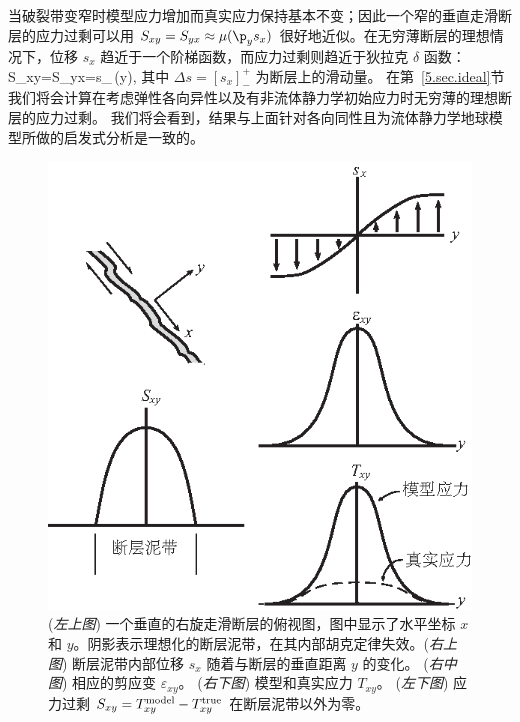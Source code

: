 当破裂带变窄时模型应力增加而真实应力保持基本不变；因此一个窄的垂直走滑断层的应力过剩可以用
$S_{xy}=S_{yx}\approx\mu(\p_y s_x)$ 很好地近似。在无穷薄断层的理想情况下，位移
$s_x$ 趋近于一个阶梯函数，而应力过剩则趋近于狄拉克 $\delta$ 函数：
\eq
\label{5.SanAnd}
S_{xy}=S_{yx}=\mu\Delta s_{\,}\delta(y),
\en
{}%
%
其中 $\Delta s=[s_x]^+_-$ 为断层上的滑动量。
在第~\ref{5.sec.ideal}节我们将会计算在考虑弹性各向异性以及有非流体静力学初始应力时无穷薄的理想断层的应力过剩。
我们将会看到，结果与上面针对各向同性且为流体静力学地球模型所做的启发式分析是一致的。
\begin{figure}[!t]
\begin{center}
\includegraphics{../figures/chap05/fig03.eps}
\end{center}
\caption[San Andreas]{\label{fig5.3}
({\em 左上图}) 一个垂直的右旋走滑断层的俯视图，图中显示了水平坐标 $x$ 和 $y$。阴影表示理想化的断层泥带，在其内部胡克定律失效。({\em 右上图}) 断层泥带内部位移 $s_x$ 随着与断层的垂直距离 $y$ 的变化。
%
({\em 右中图}) 相应的剪应变 $\varepsilon_{xy}$。  ({\em 右下图}) 模型和真实应力
$T_{xy}$。  ({\em 左下图})  应力过剩
$S_{xy}=T_{xy}^{\rm model}-T_{xy}^{\rm true}$
在断层泥带以外为零。}
\end{figure}

